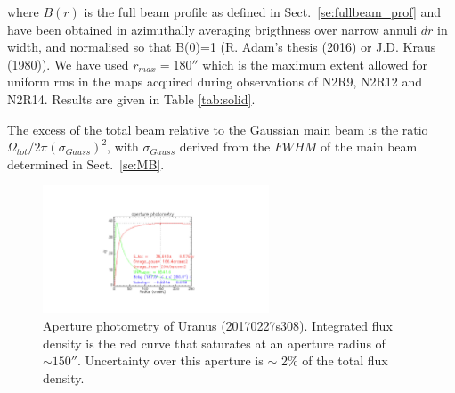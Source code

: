 \noindent where $B(r)$ is the full beam profile as defined in
Sect.~\ref{se:fullbeam_prof} and have been obtained in azimuthally averaging brigthness over narrow annuli
$dr$ in width, and normalised so that B(0)=1 (R. Adam's thesis (2016) or J.D. Kraus (1980)).
We have used $r_{max}=180''$ which is the maximum extent allowed for
uniform rms in the maps acquired during observations of N2R9, N2R12
and N2R14. Results are given in Table \ref{tab:solid}.

The excess of the total beam relative to the Gaussian main beam is the ratio
$\Omega_{tot} / 2 \pi (\sigma_{Gauss})^2$, with $\sigma_{Gauss}$
derived from the $FWHM$ of the main beam determined in Sect.~\ref{se:MB}.


\begin{figure}[ht!]
  \begin{center}
    \includegraphics[clip=true,width=0.6\textwidth, trim={8cm, 3cm, 8cm, 4cm}]{Figures/Aperture_photo/Uranus_s308_A1.pdf}
    \caption[Aperture photometry of Uranus]{Aperture photometry of Uranus (20170227s308). Integrated flux density is the red curve that
saturates at an aperture radius of $ \sim 150''$. Uncertainty over
this aperture is $\sim$ 2\% of the total flux density. }
    \label{fig:Uranus_s308}
  \end{center}
\end{figure}


